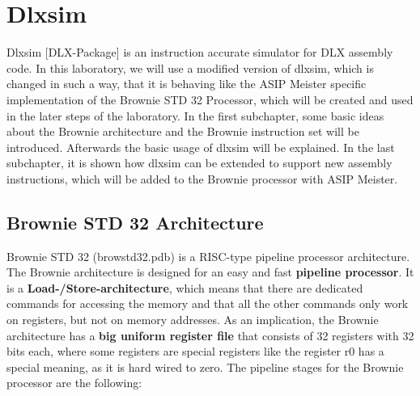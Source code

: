 \documentclass[
]{article}
\author{}
\date{}
\begin{document}
\hypertarget{dlxsim}{%
\section{Dlxsim}\label{dlxsim}}

Dlxsim {[}DLX-Package{]} is an instruction accurate simulator for DLX
assembly code. In this laboratory, we will use a modified version of
dlxsim, which is changed in such a way, that it is behaving like the
ASIP Meister specific implementation of the Brownie STD 32 Processor,
which will be created and used in the later steps of the laboratory. In
the first subchapter, some basic ideas about the Brownie architecture
and the Brownie instruction set will be introduced. Afterwards the basic
usage of dlxsim will be explained. In the last subchapter, it is shown
how dlxsim can be extended to support new assembly instructions, which
will be added to the Brownie processor with ASIP Meister.

\hypertarget{brownie-std-32-architecture}{%
\subsection{Brownie STD 32
Architecture}\label{brownie-std-32-architecture}}

Brownie STD 32 (browstd32.pdb) is a RISC-type pipeline processor
architecture. The Brownie architecture is designed for an easy and fast
\textbf{pipeline processor}. It is a \textbf{Load-/Store-architecture},
which means that there are dedicated commands for accessing the memory
and that all the other commands only work on registers, but not on
memory addresses. As an implication, the Brownie architecture has a
\textbf{big uniform register file} that consists of 32 registers with 32
bits each, where some registers are special registers like the register
r0 has a special meaning, as it is hard wired to zero. The pipeline
stages for the Brownie processor are the following:
\end{document}

